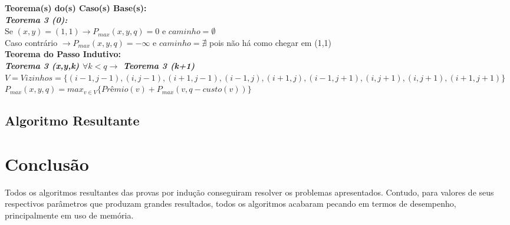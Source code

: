 \documentclass[twoside]{article}
\begin{document}
\begin{multicols}{2}
\indent 

\textbf{Teorema(s) do(s) Caso(s) Base(s):}\\

\textit{\textbf{Teorema 3 (0):}}\\
Se $ (x,y)=(1,1) \rightarrow P_{max}(x,y,q) = 0$ e $caminho = \emptyset $\\
Caso contrário $\rightarrow P_{max}(x,y,q) = -\infty $ e $caminho = \nexists $ pois não há como chegar em (1,1) \\ 

\textbf{Teorema do Passo Indutivo:}\\

\textit{\textbf{Teorema 3 (x,y,k) $\forall k < q \rightarrow$ Teorema 3 (k+1)}}\\
$V = Vizinhos = \{(i-1,j-1),(i,j-1),(i+1,j-1),(i-1,j),(i+1,j),(i-1,j+1),(i,j+1),(i,j+1),(i+1,j+1)\}$\\
$P_{max}(x,y,q) = max_{v \in V}\{Prêmio(v) + P_{max}(v,q-custo(v))\}$\\

\subsection{ Algoritmo Resultante }



\newpage
\section{Conclusão}
\indent Todos os algoritmos resultantes das provas por indução conseguiram resolver os problemas apresentados. Contudo, para valores de seus respectivos parâmetros que produzam grandes resultados, todos os algoritmos acabaram pecando em termos de desempenho, principalmente em uso de memória.\\






\end{multicols}
\end{document}
